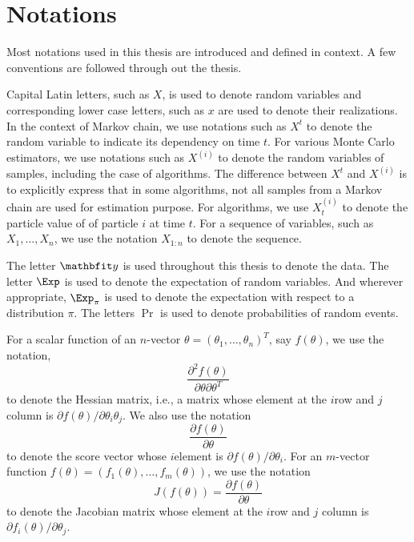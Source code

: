 \section{Notations}
\label{sec:Notations}

Most notations used in this thesis are introduced and defined in context. A
few conventions are followed through out the thesis.

Capital Latin letters, such as $X$, is used to denote random variables and
corresponding lower case letters, such as $x$ are used to denote their
realizations. In the context of Markov chain, we use notations such as $X^t$
to denote the random variable to indicate its dependency on time $t$. For
various Monte Carlo estimators, we use notations such as $X^{(i)}$ to denote
the random variables of samples, including the case of  \mcmc algorithms. The
difference between $X^t$ and $X^{(i)}$ is to explicitly express that in some
algorithms, not all samples from a Markov chain are used for estimation
purpose. For \smc algorithms, we use $X_t^{(i)}$ to denote the particle value
of of particle $i$ at time $t$. For a sequence of variables, such as
$X_1,\dots,X_n$, we use the notation $X_{1:n}$ to denote the sequence.

The letter $\data$ is used throughout this thesis to denote the data. The
letter $\Exp$ is used to denote the expectation of random variables. And
wherever appropriate, $\Exp_{\pi}$ is used to denote the expectation with
respect to a distribution $\pi$. The letters $\Pr$ is used to denote
probabilities of random events.

For a scalar function of an $n$-vector $\theta = (\theta_1,\dots,\theta_n)^T$,
say $f(\theta)$, we use the notation,
\begin{equation}
  \frac{\partial^2 f(\theta)}{\partial\theta\partial\theta^T}
\end{equation}
to denote the Hessian matrix, i.e., a matrix whose element at the $i$\xth row
and $j$\xth column is $\partial f(\theta)/\partial\theta_i\theta_j$. We also
use the notation
\begin{equation}
  \frac{\partial f(\theta)}{\partial\theta}
\end{equation}
to denote the score vector whose $i$\xth element is $\partial
f(\theta)/\partial\theta_i$. For an $m$-vector function $f(\theta) =
(f_1(\theta),\dots,f_m(\theta))$, we use the notation
\begin{equation}
  J(f(\theta)) = \frac{\partial f(\theta)}{\partial\theta}
\end{equation}
to denote the Jacobian matrix whose element at the $i$\xth row and $j$\xth
column is $\partial f_i(\theta)/\partial\theta_j$.

